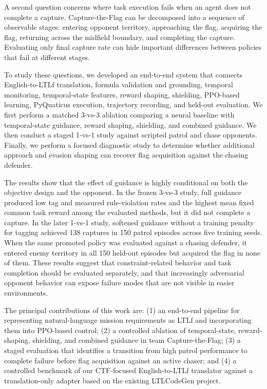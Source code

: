 \documentclass[letterpaper]{article}
\begin{document}
A second question concerns where task execution fails when an agent does not complete a capture. Capture-the-Flag can be decomposed into a sequence of observable stages: entering opponent territory, approaching the flag, acquiring the flag, returning across the midfield boundary, and completing the capture. Evaluating only final capture rate can hide important differences between policies that fail at different stages.

To study these questions, we developed an end-to-end system that connects English-to-LTLf translation, formula validation and grounding, temporal monitoring, temporal-state features, reward shaping, shielding, PPO-based learning, PyQuaticus execution, trajectory recording, and held-out evaluation. We first perform a matched 3-vs-3 ablation comparing a neural baseline with temporal-state guidance, reward shaping, shielding, and combined guidance. We then conduct a staged 1-vs-1 study against scripted patrol and chase opponents. Finally, we perform a focused diagnostic study to determine whether additional approach and evasion shaping can recover flag acquisition against the chasing defender.

The results show that the effect of guidance is highly conditional on both the objective design and the opponent. In the frozen 3-vs-3 study, full guidance produced low tag and measured rule-violation rates and the highest mean fixed common task reward among the evaluated methods, but it did not complete a capture. In the later 1-vs-1 study, softened guidance without a training penalty for tagging achieved 138 captures in 150 patrol episodes across five training seeds. When the same promoted policy was evaluated against a chasing defender, it entered enemy territory in all 150 held-out episodes but acquired the flag in none of them. These results suggest that constraint-related behavior and task completion should be evaluated separately, and that increasingly adversarial opponent behavior can expose failure modes that are not visible in easier environments.

The principal contributions of this work are: (1) an end-to-end pipeline for representing natural-language mission requirements as LTLf and incorporating them into PPO-based control; (2) a controlled ablation of temporal-state, reward-shaping, shielding, and combined guidance in team Capture-the-Flag; (3) a staged evaluation that identifies a transition from high patrol performance to complete failure before flag acquisition against an active chaser; and (4) a controlled benchmark of our CTF-focused English-to-LTLf translator against a translation-only adapter based on the existing LTLCodeGen project.
\end{document}
